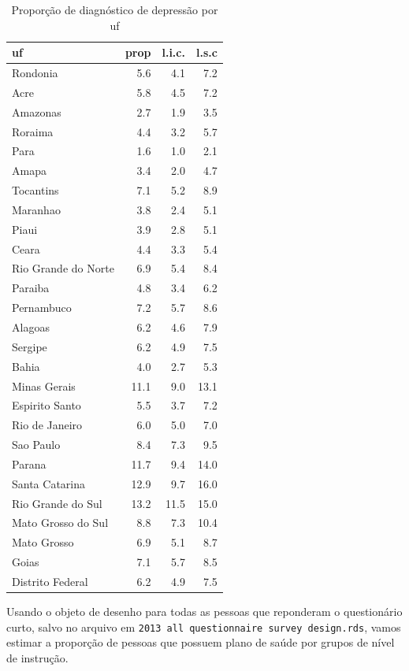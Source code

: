 \documentclass[]{book}
\theoremstyle{definition}
\theoremstyle{definition}
\theoremstyle{definition}
\theoremstyle{remark}
\begin{document}
\begin{table}

\caption{\label{tab:unnamed-chunk-49}Proporção de diagnóstico de depressão por uf}
\centering
\begin{tabular}[t]{lrrr}
\toprule
uf & prop & l.i.c. & l.s.c\\
\midrule
Rondonia & 5.6 & 4.1 & 7.2\\
Acre & 5.8 & 4.5 & 7.2\\
Amazonas & 2.7 & 1.9 & 3.5\\
Roraima & 4.4 & 3.2 & 5.7\\
Para & 1.6 & 1.0 & 2.1\\
\addlinespace
Amapa & 3.4 & 2.0 & 4.7\\
Tocantins & 7.1 & 5.2 & 8.9\\
Maranhao & 3.8 & 2.4 & 5.1\\
Piaui & 3.9 & 2.8 & 5.1\\
Ceara & 4.4 & 3.3 & 5.4\\
\addlinespace
Rio Grande do Norte & 6.9 & 5.4 & 8.4\\
Paraiba & 4.8 & 3.4 & 6.2\\
Pernambuco & 7.2 & 5.7 & 8.6\\
Alagoas & 6.2 & 4.6 & 7.9\\
Sergipe & 6.2 & 4.9 & 7.5\\
\addlinespace
Bahia & 4.0 & 2.7 & 5.3\\
Minas Gerais & 11.1 & 9.0 & 13.1\\
Espirito Santo & 5.5 & 3.7 & 7.2\\
Rio de Janeiro & 6.0 & 5.0 & 7.0\\
Sao Paulo & 8.4 & 7.3 & 9.5\\
\addlinespace
Parana & 11.7 & 9.4 & 14.0\\
Santa Catarina & 12.9 & 9.7 & 16.0\\
Rio Grande do Sul & 13.2 & 11.5 & 15.0\\
Mato Grosso do Sul & 8.8 & 7.3 & 10.4\\
Mato Grosso & 6.9 & 5.1 & 8.7\\
\addlinespace
Goias & 7.1 & 5.7 & 8.5\\
Distrito Federal & 6.2 & 4.9 & 7.5\\
\bottomrule
\end{tabular}
\end{table}

Usando o objeto de desenho para todas as pessoas que reponderam o
questionário curto, salvo no arquivo em
\texttt{2013\ all\ questionnaire\ survey\ design.rds}, vamos estimar a
proporção de pessoas que possuem plano de saúde por grupos de nível de
instrução.
\end{document}
